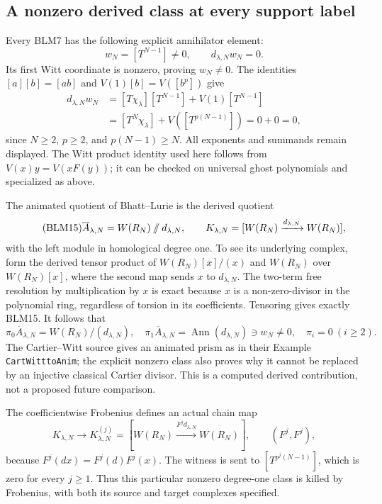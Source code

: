 \subsection{A nonzero derived class at every support label}
Every BLM7 has the following explicit annihilator element:
\begin{equation}\tag{BLM13}
w_N=[T^{N-1}]\ne0,\qquad d_{\lambda,N}w_N=0.
\end{equation}
Its first Witt coordinate is nonzero, proving $w_N\ne0$.
The identities $[a][b]=[ab]$ and $V(1)[b]=V([b^p])$ give
\begin{equation}\tag{BLM14}
\begin{split}
d_{\lambda,N}w_N
&=[T\chi_\lambda][T^{N-1}]+V(1)[T^{N-1}]\\
&=[T^N\chi_\lambda]+V([T^{p(N-1)}])=0+0=0,
\end{split}
\end{equation}
since $N\ge2$, $p\ge2$, and $p(N-1)\ge N$. All exponents
and summands remain displayed. The Witt product identity used
here follows from $V(x)y=V(xF(y))$; it can be checked on
universal ghost polynomials and specialized as above.

The animated quotient of Bhatt--Lurie is the derived quotient
\begin{equation}\tag{BLM15}
\overline A_{\lambda,N}
=W(R_N)\mathbin{/\mkern-6mu/}d_{\lambda,N},\qquad
K_{\lambda,N}=
[W(R_N)\xrightarrow{d_{\lambda,N}}W(R_N)],
\end{equation}
with the left module in homological degree one. To see its
underlying complex, form the derived tensor product of
$W(R_N)[x]/(x)$ and $W(R_N)$ over $W(R_N)[x]$, where the
second map sends $x$ to $d_{\lambda,N}$. The two-term free
resolution by multiplication by $x$ is exact because $x$ is
a non-zero-divisor in the polynomial ring, regardless of
torsion in its coefficients. Tensoring gives exactly BLM15.
It follows that
\begin{equation}\tag{BLM16}
\pi_0\overline A_{\lambda,N}=W(R_N)/(d_{\lambda,N}),\quad
\pi_1\overline A_{\lambda,N}=\operatorname{Ann}(d_{\lambda,N})
\ni w_N\ne0,\quad \pi_i=0\ (i\ge2).
\end{equation}
The Cartier--Witt source gives an animated prism as in their
Example \texttt{CartWitttoAnim}; the explicit nonzero class
also proves why it cannot be replaced by an injective
classical Cartier divisor. This is a computed derived
contribution, not a proposed future comparison.

The coefficientwise Frobenius defines an actual chain map
\begin{equation}\tag{BLM17}
K_{\lambda,N}\longrightarrow K^{(j)}_{\lambda,N}
=[W(R_N)\xrightarrow{F^j d_{\lambda,N}}W(R_N)],
\qquad (F^j,F^j),
\end{equation}
because $F^j(d x)=F^j(d)F^j(x)$. The witness is sent to
$[T^{p^j(N-1)}]$, which is zero for every $j\ge1$.
Thus this particular nonzero degree-one class is killed by
Frobenius, with both its source and target complexes specified.

